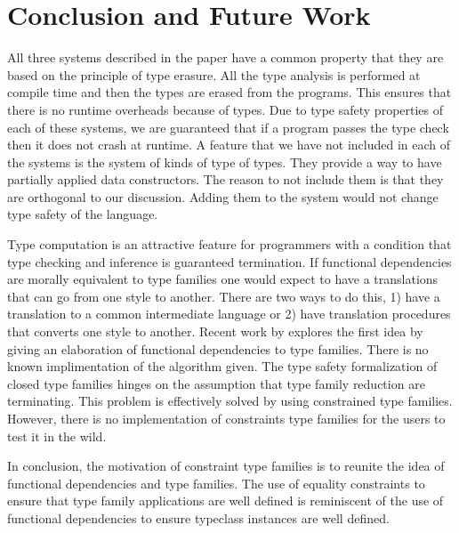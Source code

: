 \documentclass[format=sigplan,manuscript,review,screen,nonacm,margin=1in]{acmart}
\begin{document}
\section{Conclusion and Future Work}\label{sec:conclusion}
All three systems described in the paper have a common property that they are based on
the principle of type erasure. All the type analysis is performed at compile time and
then the types are erased from the programs.
This ensures that there is no runtime overheads because of types.
Due to type safety properties of each of these systems, we are guaranteed
that if a program passes the type check then it does not crash at runtime.
A feature that we have not included in each of the systems is the system of kinds of type of types.
They provide a way to have partially applied data constructors. The reason to not include them is that
they are orthogonal to our discussion. Adding them to the system would not change type safety of the language.


Type computation is an attractive feature for programmers with a condition that type checking and inference
is guaranteed termination. If functional dependencies are morally equivalent to type families
one would expect to have a translations that can go from one style to another.
There are two ways to do this, 1) have a translation to a common
intermediate language or 2) have translation procedures that converts one style to another. Recent work by
\citep{karachalias_elaboration_2017} explores the first idea by giving an elaboration of functional dependencies
to type families. There is no known implimentation of the algorithm given.
The type safety formalization of closed type families hinges on the assumption that
type family reduction are terminating. This problem is effectively solved by using constrained type families.
However, there is no implementation of constraints type families for the users to test it in the wild.

In conclusion, the motivation of constraint type families is to reunite
the idea of functional dependencies and type families.
The use of equality constraints to ensure that type family applications are well defined
is reminiscent of the use of functional dependencies to ensure typeclass instances are well defined.

\newpage


\end{document}
